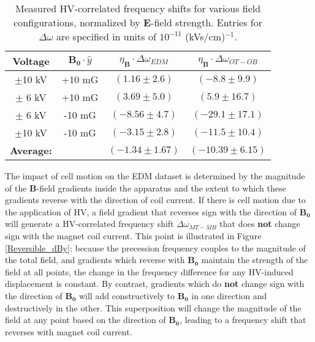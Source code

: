 \documentclass [10pt, twoside] {uwthesis}[2012/04/02]
\begin{document}
\begin{table}[ht]
\begin{center}													%
\caption[Average HV frequency shift by field configuration] 
{\narrower Measured HV-correlated frequency shifts for various field configurations, normalized by $\mathbf{E}$-field strength. Entries for $\Delta\omega$ are specified in units of $10^{-11}$ (kVs/cm)$^{-1}$.}
\begin{tabular}{cccc}													%
\hline \hline	 														%
Voltage & $\mathbf{B_0} \cdot \hat{y}$ & $\eta_{\mathbf{B}}\cdot\Delta\omega_{EDM}$ & $\eta_{\mathbf{B}}\cdot\Delta\omega_{OT-OB}$ \\ %
\hline																	%
$\pm$10 kV & +10 mG & $(1.16\pm2.6)$  & $(-8.8\pm9.9)$ \\ 
$\pm$ 6 kV & +10 mG & $(3.69\pm5.0)$  & $(5.9\pm16.7)$ \\  
$\pm$ 6 kV & -10 mG & $(-8.56\pm4.7)$ & $(-29.1\pm17.1)$ \\ 
$\pm$10 kV & -10 mG & $(-3.15\pm2.8)$ & $(-11.5\pm10.4)$ \\ 
\hline
\textbf{Average:} && $(-1.34\pm1.67)$ & $(-10.39\pm6.15)$ \\
\hline
\end{tabular} 
\label{Results} 									
\end{center}
\end{table} 

The impact of cell motion on the EDM dataset is determined by the magnitude of the $\mathbf{B}$-field gradients inside the apparatus and the extent to which these gradients reverse with the direction of coil current. If there is cell motion due to the application of HV, a field gradient that reverses sign with the direction of $\mathbf{B_0}$ will generate a HV-correlated frequency shift $\Delta\omega_{MT-MB}$ that does \textbf{not} change sign with the magnet coil current. This point is illustrated in Figure \ref{Reversible_dBy}: because the precession frequency couples to the magnitude of the total field, and gradients which reverse with $\mathbf{B_0}$ maintain the strength of the field at all points, the change in the frequency difference for any HV-induced displacement is constant. By contrast, gradients which do \textbf{not} change sign with the direction of $\mathbf{B_0}$ will add constructively to $\mathbf{B_0}$ in one direction and destructively in the other. This superposition will change the magnitude of the field at any point based on the direction of $\mathbf{B_0}$, leading to a frequency shift that reverses with magnet coil current. 
\end{document}
